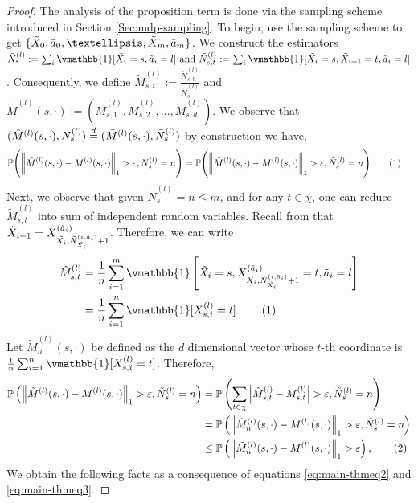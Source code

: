 \documentclass[opre,sglanonrev]{informs4}
\numberwithin{equation}{section}
\newcommand{\pow}[1]{^{(#1)}}
\newcommand{\lp}{\left(}
\newcommand{\rp}{\right)}
\newcommand{\lv}{\left|}
\newcommand{\rv}{\right|}
\newcommand{\Pbb}{\mathbb{P}}
\newcommand{\hatmls}{\Hat{M}^{(l)}(s,\cdot)}
\newcommand{\mls}{{M}^{(l)}(s,\cdot)}
\newcommand{\tildemls}{\tilde{M}^{(l)}(s,\cdot)}
\newcommand{\tildemlst}{\tilde{M}_{s,t}^{(l)}}
\newcommand\numberthis{\addtocounter{equation}{1}\tag{\theequation}}
\newcommand{\prob}{\Pbb}
\newcommand{\indicator}{\vmathbb{1}}
\newcommand{\eps}{\varepsilon}
\renewcommand{\epsilon}{\eps}
\begin{document}
\begin{APPENDICES}
\begin{proof}
The analysis of the proposition term is done via the sampling scheme introduced in Section \ref{Sec:mdp-sampling}. To begin, use the sampling scheme to get $\{\Tilde{X}_0,\tilde a_0,\dots,\Tilde X_m,\tilde a_m\}$. 
We construct the estimators $\Tilde{N}_s^{(l)} :=\sum_{i} \indicator[\tilde{X_i}=s,\tilde a_i=l] \text{ and }
\tilde{N}_{s,t}^{(l)} :=\sum_{i} \indicator[\tilde{X_i}=s,\tilde{X}_{i+1}=t,\tilde a_{i}=l]$. Consequently, we define $\tildemlst := \frac{\tilde{N}_{s,t}^{(l)}}{\tilde{N}_{s}^{(l)}}$ and $\tildemls:=\lp\tilde{M}_{s,1}^{(l)},\tilde{M}_{s,2}^{(l)},\dots,\tilde{M}_{s,d}^{(l)} \rp$. We observe that $(\hatmls, N_s\pow{l})\overset{d}{=}(\tildemls,\tilde N_s\pow{l})$ by construction we have,
\begin{align*}
    \prob\Bigg(\bigg\|\hatmls  -\mls\bigg\|_1 > \epsilon, N_s^{(l)}=n \Bigg) & = \prob\Bigg(\bigg\|\tildemls  -\mls\bigg\|_1 > \epsilon, \tilde N_s^{(l)}=n \Bigg)\numberthis\label{eq:main-thmeq4}
\end{align*}
Next, we observe that given $\tilde{N}_s^{(l)}=n\leq m$, and for any $t\in\chi$, one can reduce $\tildemlst$ into sum of independent random variables. 
Recall from  that $\tilde X_{i+1}=X_{\Tilde{X_i},\Tilde{N}_{\Tilde{X_i}}^{(i,\tilde a_i)}+1}^{(\tilde a_i)}$. 
Therefore, we can write
\begin{align*}
    \tildemlst & =\frac{1}{n}\sum_{i=1}^m \indicator \left[\tilde{X_i}=s, X_{\Tilde{X_i},\Tilde{N}_{\Tilde{X_i}}^{(i,\tilde a_i)}+1}^{(\tilde a_i)}=t,\tilde a_i=l\right]\\
    & = \frac{1}{n} \sum_{i=1}^n \indicator [X_{s,i}^{(l)}=t].\numberthis\label{eq:main-thmeq2}
\end{align*}
Let $\tilde M_n\pow{l}(s,\cdot)$ be defined as the $d$ dimensional vector whose $t$-th coordinate is $\frac{1}{n} \sum_{i=1}^n \indicator [X_{s,i}^{(l)}=t]$.
Therefore, 
\begin{align*}
    \prob\left(\left\|\tildemls-\mls\right\|_1 > \epsilon, \tilde{N}_s^{(l)}=n \right) & =  \prob\left(\sum_{t\in\chi}\lv\tildemlst-M_{s,t}\pow{l}\rv > \epsilon, \tilde{N}_s^{(l)}=n \right)\\
    & = \prob\left(\left\|\tilde M_n\pow{l}(s,
    \cdot)-\mls\right\|_1 > \epsilon, \tilde{N}_s^{(l)}=n\right)\\
    & \leq \prob\lp \left\|\tilde M_n\pow{l}(s,
    \cdot)-\mls\right\|_1 > \epsilon\rp , \numberthis\label{eq:main-thmeq3}
\end{align*}
We obtain the following facts as a consequence of equations \ref{eq:main-thmeq2} and \ref{eq:main-thmeq3}. 


\end{proof}
\end{APPENDICES}
\end{document}
